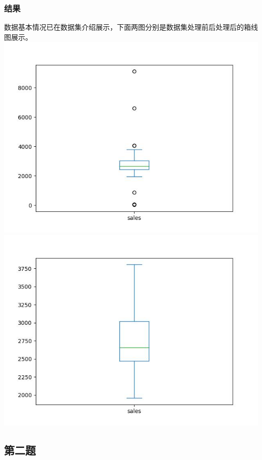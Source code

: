 \documentclass{article}
\begin{document}
        \subsubsection{结果}
            数据基本情况已在数据集介绍展示，下面两图分别是数据集处理前后处理后的箱线图展示。\\
            \includegraphics[scale=0.7]{img/1-1.jpg}\\
            \includegraphics[scale=0.7]{img/1-2.jpg}\\
    
    \subsection{第二题}
\end{document}
